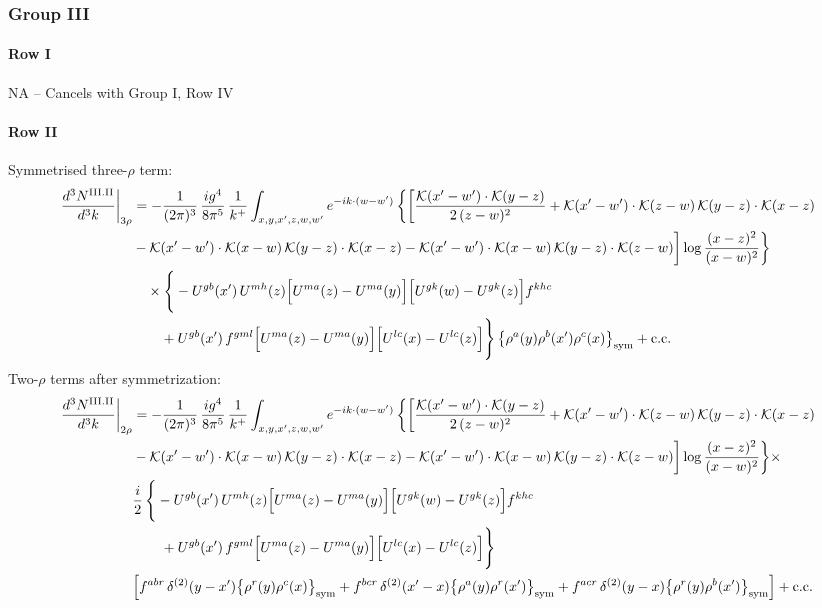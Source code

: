 \documentclass[9pt]{article}
\numberwithin{equation}{section}
\begin{document}
\subsubsection{Group III}
\paragraph*{Row I}
\textsc{NA} -- Cancels with Group I, Row IV
\paragraph*{Row II}
Symmetrised three-$\rho$ term:
\begin{align}
\frac{d^{3}N^{\rm III.II}}{d^{3}k}\bigg|_{3\rho}&=-\frac{1}{(2\pi)^{3}}\,\frac{ig^{4}}{8\pi^{5}}\,\frac{1}{k^{+}}\int_{x,y,x',z,w,w'}e^{-ik\cdot(w-w')}\,\bigg\{\bigg[\frac{\mathcal{K}(x'-w')\cdot\mathcal{K}(y-z)}{2\,(z-w)^{2}}+\mathcal{K}(x'-w')\cdot\mathcal{K}(z-w)\,\mathcal{K}(y-z)\cdot\mathcal{K}(x-z)\notag\\
&-\mathcal{K}(x'-w')\cdot\mathcal{K}(x-w)\,\mathcal{K}(y-z)\cdot\mathcal{K}(x-z)-\mathcal{K}(x'-w')\cdot\mathcal{K}(x-w)\,\mathcal{K}(y-z)\cdot\mathcal{K}(z-w)\bigg]\log\frac{(x-z)^{2}}{(x-w)^{2}}\bigg\}\notag\\&\quad\times \Bigg\{-U^{gb}(x')\,U^{mh}(z)\Big[U^{ma}(z)-U^{ma}(y)\Big]\Big[U^{gk}(w)-U^{gk}(z)\Big]f^{khc}\notag\\&\qquad+U^{gb}(x')\,f^{gml}\Big[U^{ma}(z)-U^{ma}(y)\Big]\Big[U^{lc}(x)-U^{lc}(z)\Big]\Bigg\}\,\big\{\rho^{a}(y)\rho^{b}(x')\rho^{c}(x)\big\}_{\rm sym}+{\rm c.c.}\label{eq:H-III.II-3}
\end{align}
Two-$\rho$ terms after symmetrization:
\begin{align}
\frac{d^{3}N^{\rm III.II}}{d^{3}k}\bigg|_{2\rho}&=-\frac{1}{(2\pi)^{3}}\,\frac{ig^{4}}{8\pi^{5}}\,\frac{1}{k^{+}}\int_{x,y,x',z,w,w'}e^{-ik\cdot(w-w')}\,\bigg\{\bigg[\frac{\mathcal{K}(x'-w')\cdot\mathcal{K}(y-z)}{2\,(z-w)^{2}}+\mathcal{K}(x'-w')\cdot\mathcal{K}(z-w)\,\mathcal{K}(y-z)\cdot\mathcal{K}(x-z)\notag\\
&-\mathcal{K}(x'-w')\cdot\mathcal{K}(x-w)\,\mathcal{K}(y-z)\cdot\mathcal{K}(x-z)-\mathcal{K}(x'-w')\cdot\mathcal{K}(x-w)\,\mathcal{K}(y-z)\cdot\mathcal{K}(z-w)\bigg]\log\frac{(x-z)^{2}}{(x-w)^{2}}\bigg\}\times\,\notag\\
& \frac{i}{2}\,\Bigg\{-U^{gb}(x')\,U^{mh}(z)\Big[U^{ma}(z)-U^{ma}(y)\Big]\Big[U^{gk}(w)-U^{gk}(z)\Big]f^{khc}\notag\\&\qquad+U^{gb}(x')\,f^{gml}\Big[U^{ma}(z)-U^{ma}(y)\Big]\Big[U^{lc}(x)-U^{lc}(z)\Big]\Bigg\}\notag \\ & \Big[f^{abr}\,\delta^{(2)}(y-x')\big\{\rho^{r}(y)\rho^{c}(x)\big\}_{\rm sym} +f^{bcr}\,\delta^{(2)}(x'-x)\big\{\rho^{a}(y)\rho^{r}(x')\big\}_{\rm sym} +f^{acr}\,\delta^{(2)}(y-x)\big\{\rho^{r}(y)\rho^{b}(x')\big\}_{\rm sym}\Big]+{\rm c.c.}\label{eq:H-III.II-2}
\end{align}
\end{document}

